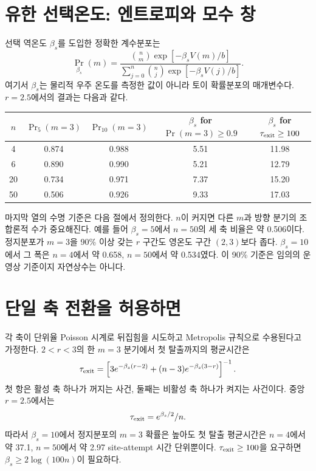 \documentclass[11pt,a4paper]{article}
\begin{document}
\section{유한 선택온도: 엔트로피와 모수 창}
선택 역온도 $\beta_s$를 도입한 정확한 계수분포는
\begin{equation}
\Pr_{\beta_s}(m)=
\frac{\binom nm\exp[-\beta_sV(m)/b]}
{\sum_{j=0}^{n}\binom nj\exp[-\beta_sV(j)/b]}.
\end{equation}
여기서 $\beta_s$는 물리적 우주 온도를 측정한 값이 아니라
토이 확률분포의 매개변수다. $r=2.5$에서의 결과는 다음과 같다.
\begin{center}
\begin{tabular}{@{}ccccc@{}}
\toprule
$n$ & $\Pr_5(m=3)$ & $\Pr_{10}(m=3)$ &
$\beta_s$ for $\Pr(m=3)\ge0.9$ & $\beta_s$ for $\tau_{\rm exit}\ge100$\\
\midrule
4 & 0.874 & 0.988 & 5.51 & 11.98\\
6 & 0.890 & 0.990 & 5.21 & 12.79\\
20 & 0.734 & 0.971 & 7.37 & 15.20\\
50 & 0.506 & 0.926 & 9.33 & 17.03\\
\bottomrule
\end{tabular}
\end{center}
마지막 열의 수명 기준은 다음 절에서 정의한다. $n$이 커지면
다른 $m$과 방향 분기의 조합론적 수가 중요해진다.
예를 들어 $\beta_s=5$에서 $n=50$의 세 축 비율은 약 0.506이다.
정지분포가 $m=3$을 90\% 이상 갖는 $r$ 구간도 영온도 구간
$(2,3)$보다 좁다. $\beta_s=10$에서 그 폭은 $n=4$에서
약 0.658, $n=50$에서 약 0.534였다. 이 90\% 기준은
임의의 운영상 기준이지 자연상수는 아니다.

\section{단일 축 전환을 허용하면}
각 축이 단위율 Poisson 시계로 뒤집힘을 시도하고
Metropolis 규칙으로 수용된다고 가정한다.
$2<r<3$의 한 $m=3$ 분기에서 첫 탈출까지의 평균시간은
\begin{equation}
\tau_{\rm exit}=
\left[3e^{-\beta_s(r-2)}+(n-3)e^{-\beta_s(3-r)}\right]^{-1}.
\end{equation}
첫 항은 활성 축 하나가 꺼지는 사건, 둘째는 비활성 축
하나가 켜지는 사건이다. 중앙 $r=2.5$에서는
\begin{equation}
\tau_{\rm exit}=e^{\beta_s/2}/n.
\end{equation}
따라서 $\beta_s=10$에서 정지분포의 $m=3$ 확률은 높아도
첫 탈출 평균시간은 $n=4$에서 약 37.1, $n=50$에서 약 2.97
site-attempt 시간 단위뿐이다. $\tau_{\rm exit}\ge100$을
요구하면 $\beta_s\ge2\log(100n)$이 필요하다.
\end{document}
